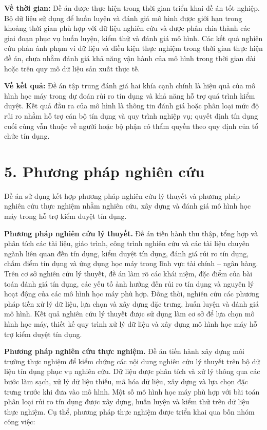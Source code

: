 \textbf{Về thời gian:} Đề án được thực hiện trong thời gian triển khai đề án tốt
nghiệp. Bộ dữ liệu sử dụng để huấn luyện và đánh giá mô hình được giới hạn trong
khoảng thời gian phù hợp với dữ liệu nghiên cứu và được phân chia thành các giai
đoạn phục vụ huấn luyện, kiểm thử và đánh giá mô hình. Các kết quả nghiên cứu
phản ánh phạm vi dữ liệu và điều kiện thực nghiệm trong thời gian thực hiện đề
án, chưa nhằm đánh giá khả năng vận hành của mô hình trong thời gian dài hoặc
trên quy mô dữ liệu sản xuất thực tế.

\textbf{Về kết quả:} Đề án tập trung đánh giá hai khía cạnh chính là hiệu quả của
mô hình học máy trong dự đoán rủi ro tín dụng và khả năng hỗ trợ quá trình kiểm
duyệt. Kết quả đầu ra của mô hình là thông tin đánh giá hoặc phân loại mức độ rủi
ro nhằm hỗ trợ cán bộ tín dụng và quy trình nghiệp vụ; quyết định
tín dụng cuối cùng vẫn thuộc về người hoặc bộ phận có thẩm quyền theo quy định
của tổ chức tín dụng.

\section*{5. Phương pháp nghiên cứu}

Đề án sử dụng kết hợp phương pháp nghiên cứu lý thuyết và phương pháp nghiên cứu
thực nghiệm nhằm nghiên cứu, xây dựng và đánh giá mô hình học máy trong hỗ trợ
kiểm duyệt tín dụng.

\textbf{Phương pháp nghiên cứu lý thuyết.} Đề án tiến hành thu thập, tổng hợp và
phân tích các tài liệu, giáo trình, công trình nghiên cứu và các tài liệu chuyên
ngành liên quan đến tín dụng, kiểm duyệt tín dụng, đánh giá rủi ro tín dụng, chấm
điểm tín dụng và ứng dụng học máy trong lĩnh vực tài chính -- ngân hàng. Trên cơ
sở nghiên cứu lý thuyết, đề án làm rõ các khái niệm, đặc điểm của bài toán đánh
giá tín dụng, các yếu tố ảnh hưởng đến rủi ro tín dụng và nguyên lý hoạt động của
các mô hình học máy phù hợp. Đồng thời, nghiên cứu các phương pháp tiền xử lý dữ
liệu, lựa chọn và xây dựng đặc trưng, huấn luyện và đánh giá mô hình. Kết quả
nghiên cứu lý thuyết được sử dụng làm cơ sở để lựa chọn mô hình học máy, thiết kế
quy trình xử lý dữ liệu và xây dựng mô hình học máy hỗ trợ kiểm duyệt tín dụng.

\textbf{Phương pháp nghiên cứu thực nghiệm.} Đề án tiến hành xây dựng môi trường
thực nghiệm để kiểm chứng các nội dung nghiên cứu lý thuyết trên bộ dữ liệu tín
dụng phục vụ nghiên cứu. Dữ liệu được phân tích và xử lý thông qua các bước làm
sạch, xử lý dữ liệu thiếu, mã hóa dữ liệu, xây dựng và lựa chọn đặc trưng trước
khi đưa vào mô hình. Một số mô hình học máy phù hợp với bài toán phân loại rủi ro
tín dụng được xây dựng, huấn luyện và kiểm thử trên dữ liệu thực nghiệm. Cụ thể,
phương pháp thực nghiệm được triển khai qua bốn nhóm công việc:

